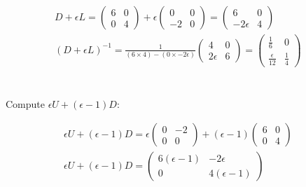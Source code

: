 \documentclass[../main.tex]{subfiles}
\begin{document}
    \begin{center*}
        \begin{align*}
            & D + \epsilon L = \begin{pmatrix}
                6 & 0 \\
                0 & 4
            \end{pmatrix} + \epsilon \begin{pmatrix}
                0 & 0 \\
                -2 & 0
            \end{pmatrix} = \begin{pmatrix}
                6 & 0 \\
                -2 \epsilon & 4
            \end{pmatrix} && \\
            & (D + \epsilon L)^{-1} = \frac{1}{(6\times4)-(0\times-2\epsilon)} \begin{pmatrix}
                4 & 0 \\
                2 \epsilon & 6
            \end{pmatrix} = \begin{pmatrix}
                \frac{1}{6} & 0 \\
                \frac{\epsilon}{12} & \frac{1}{4}
            \end{pmatrix} && \\
        \end{align*}
    \end{center*}\\
    Compute $\epsilon U + (\epsilon - 1)D$:
    \begin{center*}
        \begin{align*}
            & \epsilon U + (\epsilon - 1)D = \epsilon \begin{pmatrix}
                0 & -2 \\
                0 & 0
            \end{pmatrix} + (\epsilon - 1) \begin{pmatrix}
                6 & 0 \\
                0 & 4
            \end{pmatrix} && \\
            & \epsilon U + (\epsilon - 1)D = \begin{pmatrix}
                6(\epsilon - 1) & -2\epsilon \\
                0 & 4(\epsilon - 1)
            \end{pmatrix} && \\
        \end{align*}
    \end{center*}\\
\end{document}
